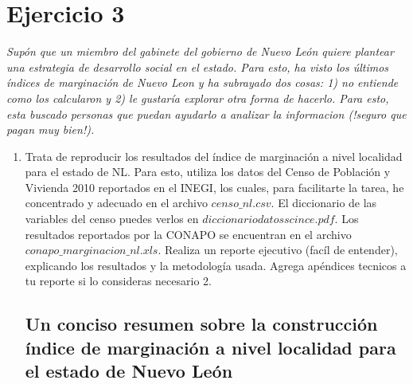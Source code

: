 \documentclass[paper=letter, fontsize=11pt]{scrartcl}
\numberwithin{equation}{section} %
\numberwithin{figure}{section} %
\numberwithin{table}{section} %
\begin{document}
\section{Ejercicio 3}
\textit{Supón que un miembro del gabinete del gobierno de Nuevo León quiere plantear una estrategia de desarrollo social en el estado. Para esto, ha visto los últimos índices de marginación de Nuevo Leon y ha subrayado dos cosas: 1) no entiende como los calcularon y 2) le gustaría explorar otra forma de hacerlo. Para esto, esta buscado
personas que puedan ayudarlo a analizar la informacion (!seguro que pagan muy bien!). }\\
\begin{enumerate}
\item Trata de reproducir los resultados del índice de marginación a nivel localidad para el estado de NL. Para esto, utiliza los datos del Censo de Población y Vivienda 2010 reportados en el INEGI, los cuales, para facilitarte la tarea, he concentrado y adecuado en el archivo $censo\_nl.csv$. El diccionario de las variables del
censo puedes verlos en $diccionariodatosscince.pdf$. Los resultados reportados por la CONAPO se encuentran en el archivo $conapo\_marginacion\_nl.xls$. Realiza un reporte ejecutivo (facíl de entender), explicando
los resultados y la metodología usada. Agrega apéndices tecnicos a tu reporte si lo consideras necesario 2.\\
\subsection{Un conciso resumen sobre la construcción índice de marginación a nivel localidad para el estado de Nuevo León}


\end{enumerate}
\end{document}

